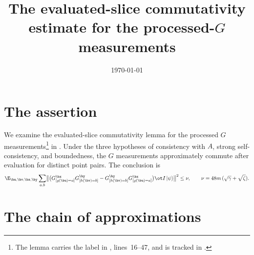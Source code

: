 \documentclass{article}
\title{The evaluated-slice commutativity estimate for the
processed-$G$ measurements}
\author{}
\date{\today}
\begin{document}
\maketitle

\section{The assertion}

We examine the evaluated-slice commutativity lemma for the
processed $G$ measurements\footnote{The lemma carries the label
 in
, lines~16--47, and is
tracked in .}
in \cite{Ji2020LowIndividualDegree}. Under the three hypotheses of
consistency with $A$, strong self-consistency, and boundedness, the
$G$ measurements approximately commute after evaluation for distinct
point pairs. The conclusion is
\begin{equation}\label{eq:processed-conclusion}
  \E_{\bu,\bv,\bx,\by} \sum_{a,b}
    \bigl\|\bigl(G^{\bx}_{[g(\bu)=a]} G^{\by}_{[h(\bv)=b]}
      - G^{\by}_{[h(\bv)=b]} G^{\bx}_{[g(\bu)=a]}\bigr)
    \ot I \ket{\psi}\bigr\|^{2}
  \leq 
  \nu, \qquad
  \nu = 48m\,(\sqrt{\gamma} + \sqrt{\zeta}).
\end{equation}

\section{The chain of approximations}
\end{document}
